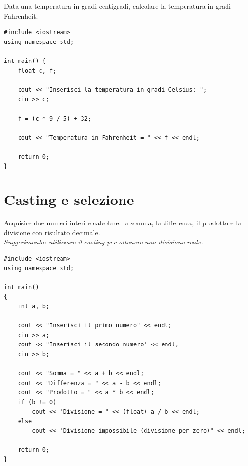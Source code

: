 \documentclass[11pt,fleqn]{book}
\begin{document}
\begin{esercizio}[1]
    Data una temperatura in gradi centigradi, calcolare la temperatura in gradi Fahrenheit.
    \ifsoluzioni
        \solution
        \begin{lstlisting}[style=cpp]
#include <iostream>
using namespace std;

int main() {
    float c, f;

    cout << "Inserisci la temperatura in gradi Celsius: ";
    cin >> c;

    f = (c * 9 / 5) + 32;

    cout << "Temperatura in Fahrenheit = " << f << endl;

    return 0;
}
        \end{lstlisting}
    \fi  
\end{esercizio}

\section{Casting e selezione}

\begin{esercizio}[1]
    Acquisire due numeri interi e calcolare: la somma, la differenza, il prodotto e la divisione con risultato decimale.\\
    \textit{Suggerimento: utilizzare il casting per ottenere una divisione reale.}
    \ifsoluzioni
    \solution
    \begin{lstlisting}[style=cpp]
#include <iostream>
using namespace std;

int main()
{
    int a, b;

    cout << "Inserisci il primo numero" << endl;
    cin >> a;
    cout << "Inserisci il secondo numero" << endl;
    cin >> b;

    cout << "Somma = " << a + b << endl;
    cout << "Differenza = " << a - b << endl;
    cout << "Prodotto = " << a * b << endl;
    if (b != 0)
        cout << "Divisione = " << (float) a / b << endl;
    else
        cout << "Divisione impossibile (divisione per zero)" << endl;

    return 0;
}
    \end{lstlisting}
    \fi
\end{esercizio}
\end{document}
